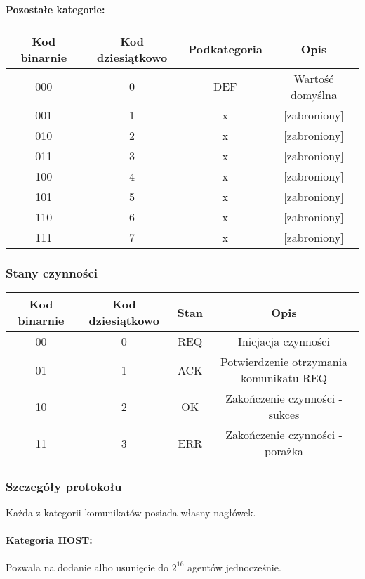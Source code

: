 \documentclass[10pt,a4paper]{article}
\begin{document}
				\paragraph{Pozostałe kategorie:\\}
				
				\begin{tabular}{ c | c | c | c }
				    \textbf{Kod binarnie} & \textbf{Kod dziesiątkowo} & \textbf{Podkategoria} & \textbf{Opis} \\
				    \hline
				    000 & 0 & DEF & Wartość domyślna \\
				    001 & 1 & x & [zabroniony] \\
				    010 & 2 & x & [zabroniony] \\
				    011 & 3 & x & [zabroniony] \\
				    100 & 4 & x & [zabroniony] \\
				    101 & 5 & x & [zabroniony] \\
				    110 & 6 & x & [zabroniony] \\
				    111 & 7 & x & [zabroniony] \\
				\end{tabular}
		        
	        \subsubsection{Stany czynności}
		        \begin{tabular}{ c | c | c | c }
				    \textbf{Kod binarnie} & \textbf{Kod dziesiątkowo} & \textbf{Stan} & \textbf{Opis} \\
				    \hline
				    00 & 0 & REQ & Inicjacja czynności \\
				    01 & 1 & ACK & Potwierdzenie otrzymania komunikatu REQ \\
				    10 & 2 & OK & Zakończenie czynności - sukces \\
				    11 & 3 & ERR & Zakończenie czynności - porażka \\
				\end{tabular}
				
        \subsubsection{Szczegóły protokołu}
            Każda z kategorii komunikatów posiada własny nagłówek.
            
            \paragraph{Kategoria HOST:\\}
            Pozwala na dodanie albo usunięcie do $2^{16}$ agentów jednocześnie.
            
\end{document}
